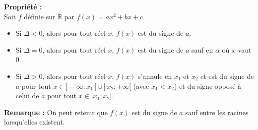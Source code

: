 \documentclass[11pt,a4paper]{article}
\begin{document}
\begin{mdframed}[style=proprieteStyle]
	\textbf{Propriété :} ~\\
	Soit $f$ définie sur $\mathbb{R}$ par $f(x)=ax^2+bx+c$.
	\begin{itemize}
		\item Si $\Delta<0$, alors pour tout réel $x$, $f(x)$ est du signe de $a$.
		\item Si $\Delta=0$, alors pour tout réel $x$, $f(x)$ est du signe de $a$ sauf en $\alpha$ où $x$ vaut $0$.
		\item Si $\Delta>0$, alors pour tout réel $x$, $f(x)$ s'annule en $x_1$ et $x_2$ et est du signe de $a$ pour 
		tout $x\in]-\infty;x_1[\cup]x_2;+\infty[$ (avec $x_1<x_2$) et du signe opposé à celui de $a$ pour tout $x\in]x_1;x_2[$.
	\end{itemize}
\end{mdframed}
\textbf{Remarque :} On peut retenir que $f(x)$ est du signe de $a$ sauf entre les racines lorsqu'elles existent.
\end{document}
